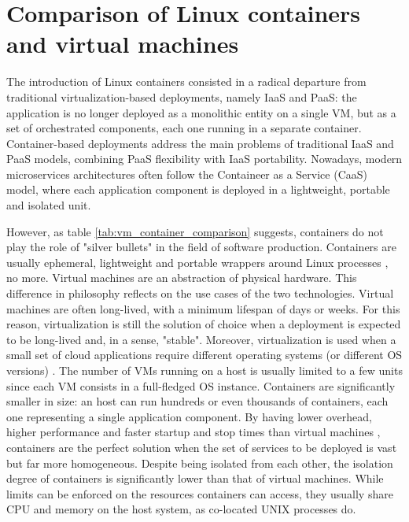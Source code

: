 \section{Comparison of Linux containers and virtual machines}
The introduction of Linux containers consisted in a radical departure from traditional virtualization-based deployments, namely IaaS and PaaS: the application is no longer deployed as a monolithic entity on a single VM, but as a set of orchestrated components, each one running in a separate container. 
Container-based deployments address the main problems of traditional IaaS and PaaS models, combining PaaS flexibility with IaaS portability.
Nowadays, modern microservices architectures often follow the Containeer as a Service (CaaS) model, where each application component is deployed in a lightweight, portable and isolated unit.

However, as table \ref{tab:vm_container_comparison} suggests, containers do not play the role of "silver bullets" in the field of software production. 
Containers are usually ephemeral, lightweight and portable wrappers around Linux processes \cite{kaneDockerRunningShipping2023}, 
no more. Virtual machines are an abstraction of physical hardware. 
This difference in philosophy reflects on the use cases of the two technologies. \newline
Virtual machines are often long-lived, with a minimum lifespan of days or weeks. 
For this reason, virtualization is still the solution of choice when a deployment is expected to be long-lived and, in a sense, "stable".
Moreover, virtualization is used when a small set of cloud applications require different operating systems (or different OS versions) \cite{bernstein2014containers}. 
The number of VMs running on a host is usually limited to a few units since each VM consists in a full-fledged OS instance.
Containers are significantly smaller in size: an host can run hundreds or even thousands of containers, each one representing a single application component.
By having lower overhead, higher performance and faster startup and stop times than virtual machines \cite{felter2015updated,chae2019performance}, containers are the perfect solution when the set of services to be deployed is vast but far more homogeneous.
Despite being isolated from each other, the isolation degree of containers is significantly lower than that of virtual machines. While limits can be enforced on the resources containers can access, they usually share CPU and memory on the host system, as co-located UNIX processes do. 

